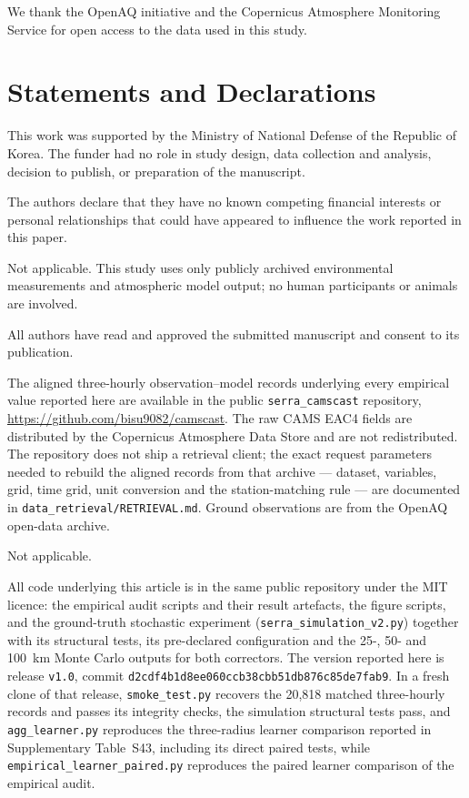 \documentclass[sn-basic,lineno]{sn-jnl}
\begin{document}
We thank the OpenAQ initiative and the Copernicus Atmosphere Monitoring Service for open access
to the data used in this study.

\section*{Statements and Declarations}

This work was supported by the Ministry of National Defense of the Republic of Korea. The funder
had no role in study design, data collection and analysis, decision to publish, or preparation
of the manuscript.

The authors declare that they have no known competing financial interests or personal
relationships that could have appeared to influence the work reported in this paper.

Not applicable. This study uses only publicly archived environmental measurements and
atmospheric model output; no human participants or animals are involved.

All authors have read and approved the submitted manuscript and consent to its publication.

The aligned three-hourly observation--model records underlying every empirical value reported
here are available in the public \texttt{serra\_camscast} repository,
\url{https://github.com/bisu9082/camscast}. The raw CAMS EAC4 fields are distributed by
the Copernicus Atmosphere Data Store and are not redistributed. The repository does not ship a
retrieval client; the exact request parameters needed to rebuild the aligned records from that
archive --- dataset, variables, grid, time grid, unit conversion and the station-matching rule ---
are documented in \texttt{data\_retrieval/RETRIEVAL.md}. Ground observations are from the OpenAQ open-data archive.

Not applicable.

All code underlying this article is in the same public repository under the MIT licence:
the empirical audit scripts and their result artefacts, the figure scripts, and the
ground-truth stochastic experiment (\texttt{serra\_simulation\_v2.py}) together with its
structural tests, its pre-declared configuration and the 25-, 50- and 100~km Monte Carlo
outputs for both correctors. The version reported here is release \texttt{v1.0}, commit
\texttt{d2cdf4b1d8ee060ccb38cbb51db876c85de7fab9}. In a fresh clone of that release,
\texttt{smoke\_test.py} recovers the 20,818 matched three-hourly records and passes its
integrity checks, the simulation structural tests pass, and \texttt{agg\_learner.py}
reproduces the three-radius learner comparison reported in Supplementary Table~S43, including its direct paired tests, while \texttt{empirical\_learner\_paired.py} reproduces the paired learner comparison of the empirical audit.
\end{document}
